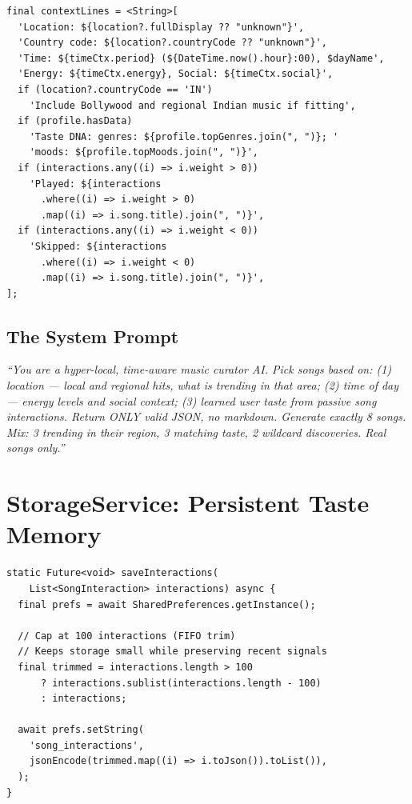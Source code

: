 \documentclass[12pt, a4paper]{report}
\begin{document}
\begin{tcolorbox}[cyanbox, title=Context Block Assembly]
\begin{lstlisting}[style=dartcode]
final contextLines = <String>[
  'Location: ${location?.fullDisplay ?? "unknown"}',
  'Country code: ${location?.countryCode ?? "unknown"}',
  'Time: ${timeCtx.period} (${DateTime.now().hour}:00), $dayName',
  'Energy: ${timeCtx.energy}, Social: ${timeCtx.social}',
  if (location?.countryCode == 'IN')
    'Include Bollywood and regional Indian music if fitting',
  if (profile.hasData)
    'Taste DNA: genres: ${profile.topGenres.join(", ")}; '
    'moods: ${profile.topMoods.join(", ")}',
  if (interactions.any((i) => i.weight > 0))
    'Played: ${interactions
      .where((i) => i.weight > 0)
      .map((i) => i.song.title).join(", ")}',
  if (interactions.any((i) => i.weight < 0))
    'Skipped: ${interactions
      .where((i) => i.weight < 0)
      .map((i) => i.song.title).join(", ")}',
];
\end{lstlisting}
\end{tcolorbox}

\subsection{The System Prompt}

\begin{tcolorbox}[theorybox]
\textit{``You are a hyper-local, time-aware music curator AI. Pick songs based
on: (1) location --- local and regional hits, what is trending in that area;
(2) time of day --- energy levels and social context; (3) learned user taste
from passive song interactions. Return ONLY valid JSON, no markdown.
Generate exactly 8 songs. Mix: 3 trending in their region,
3 matching taste, 2 wildcard discoveries. Real songs only.''}
\end{tcolorbox}

\section{StorageService: Persistent Taste Memory}

\begin{tcolorbox}[cyanbox, title=lib/services/storage\_service.dart]
\begin{lstlisting}[style=dartcode]
static Future<void> saveInteractions(
    List<SongInteraction> interactions) async {
  final prefs = await SharedPreferences.getInstance();

  // Cap at 100 interactions (FIFO trim)
  // Keeps storage small while preserving recent signals
  final trimmed = interactions.length > 100
      ? interactions.sublist(interactions.length - 100)
      : interactions;

  await prefs.setString(
    'song_interactions',
    jsonEncode(trimmed.map((i) => i.toJson()).toList()),
  );
}
\end{lstlisting}
\end{tcolorbox}
\end{document}
